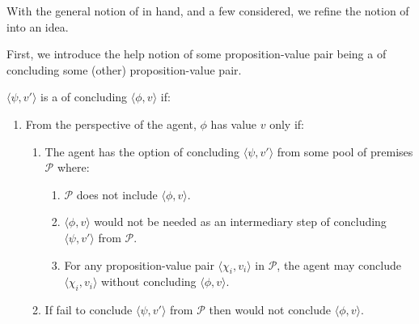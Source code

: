 \begin{note}
  With the general notion of \csN{} in hand, and a few  considered, we refine the notion of \csN{} into an idea.

  First, we introduce the help notion of some proposition-value pair being a \requ{} of concluding some (other) proposition-value pair.

  \begin{notion}
    \label{notion:overview:requ}
    \(\langle \psi,v' \rangle\) is a \requ{} of concluding \(\langle \phi,v \rangle\) if:
    \begin{enumerate}
    \item From the perspective of the agent, \(\phi\) has value \(v\) only if:
      \begin{enumerate}[label=\alph*., ref=(\alph*)]
      \item
        \label{notion:overview:requ:pool}
        The agent has the option of concluding \(\langle \psi, v' \rangle\) from some pool of premises \(\mathcal{P}\) where:
        \begin{enumerate}[label=\roman*., ref=(\roman*), series=csIdeaCounter]
        \item
          \label{notion:overview:requ:pool:incl}
          \(\mathcal{P}\) does not include \(\langle \phi,v \rangle\).
        \item
          \label{notion:overview:requ:pool:int}
          \(\langle \phi,v \rangle\) would not be needed as an intermediary step of concluding \(\langle \psi,v' \rangle\) from \(\mathcal{P}\).
        \item
          \label{notion:overview:requ:pool:ind}
          For any proposition-value pair \(\langle \chi_{i}, v_{i} \rangle\) in \(\mathcal{P}\), the agent may conclude \(\langle \chi_{i}, v_{i} \rangle\) without concluding \(\langle \phi,v \rangle\).
        \end{enumerate}
      \item
        \label{notion:overview:requ:nPsi-nPhi}
        If fail to conclude \(\langle \psi,v' \rangle\) from \(\mathcal{P}\) then would not conclude \(\langle \phi,v \rangle\).
      \end{enumerate}
    \end{enumerate}
    \vspace{-\baselineskip}
  \end{notion}


\end{note}
